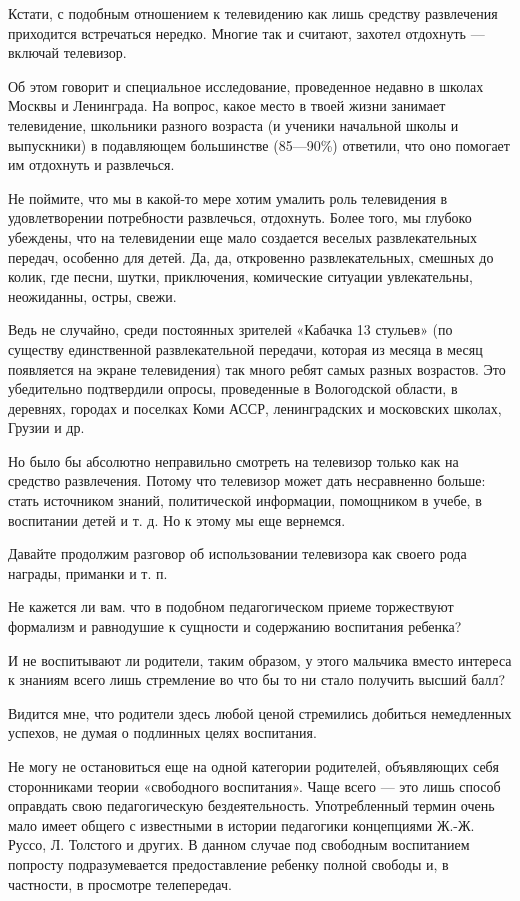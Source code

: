 \documentclass[12pt, a4paper, openany]{book}
\begin{document}
Кстати, с подобным отношением к телевидению как лишь средству развлечения приходится встречаться нередко. Многие так и считают, захотел отдохнуть — включай телевизор. 

Об этом говорит и специальное исследование, проведенное недавно в школах Москвы и Ленинграда. На вопрос, какое место в твоей жизни занимает телевидение, школьники разного возраста (и ученики начальной школы и выпускники) в подавляющем большинстве (85—90\%) ответили, что оно помогает им отдохнуть и развлечься. 

Не поймите, что мы в какой-то мере хотим умалить роль телевидения в удовлетворении потребности развлечься, отдохнуть. Более того, мы глубоко убеждены, что на телевидении еще мало создается веселых развлекательных передач, особенно для детей. Да, да, откровенно развлекательных, смешных до колик, где песни, шутки, приключения, комические ситуации увлекательны, неожиданны, остры, свежи. 

Ведь не случайно, среди постоянных зрителей «Кабачка 13 стульев» (по существу единственной развлекательной передачи, которая из месяца в месяц появляется на экране телевидения) так много ребят самых разных возрастов. Это убедительно подтвердили опросы, проведенные в Вологодской области, в деревнях, городах и поселках Коми АССР, ленинградских и московских школах, Грузии и др. 

Но было бы абсолютно неправильно смотреть на телевизор только как на средство развлечения. Потому что телевизор может дать несравненно больше: стать источником знаний, политической информации, помощником в учебе, в воспитании детей и т. д. Но к этому мы еще вернемся. 

Давайте продолжим разговор об использовании телевизора как своего рода награды, приманки и т. п. 

Не кажется ли вам. что в подобном педагогическом приеме торжествуют формализм и равнодушие к сущности и содержанию воспитания ребенка? 

И не воспитывают ли родители, таким образом, у этого мальчика вместо интереса к знаниям всего лишь стремление во что бы то ни стало получить высший балл? 

Видится мне, что родители здесь любой ценой стремились добиться немедленных успехов, не думая о подлинных целях воспитания. 

Не могу не остановиться еще на одной категории родителей, объявляющих себя сторонниками теории «свободного воспитания». Чаще всего — это лишь способ оправдать свою педагогическую бездеятельность. Употребленный термин очень мало имеет общего с известными в истории педагогики концепциями Ж.-Ж. Руссо, Л. Толстого и других. В данном случае под свободным воспитанием попросту подразумевается предоставление ребенку полной свободы и, в частности, в просмотре телепередач. 
\end{document}
